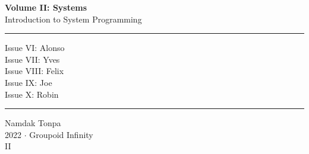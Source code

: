 \documentclass{article}
\begin{document}
\begin{titlepage}
    \centering
    \vspace*{0.5in}
    \Huge
    \textbf{Volume II: Systems} \\
    \LARGE
    Introduction to System Programming \\
    \vspace{1.5in}
    \rule{\textwidth}{0.4pt}
    \flushleft
    \small
    Issue VI: Alonso \\
    Issue VII: Yves \\
    Issue VIII: Felix \\
    Issue IX: Joe \\
    Issue X: Robin \\
    \rule{\textwidth}{0.4pt}
    \centering
    \vfill
    \large
    Namdak Tonpa \\
    \Large
    2022 $\cdot$ Groupoid Infinity \\
    II
\end{titlepage}

\tableofcontents
\newif\ifincludeTOC
\includeTOCfalse
\newpage \begin{standalone}  \end{standalone} %
\newpage \begin{standalone}    \end{standalone} %
\newpage \begin{standalone}   \end{standalone} %
\newpage \begin{standalone}     \end{standalone} %
\newpage \begin{standalone}   \end{standalone} %
\end{document}
